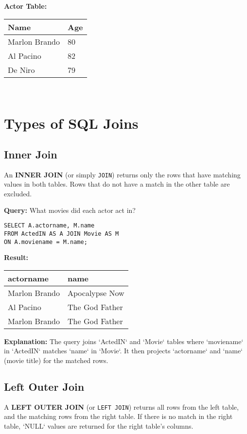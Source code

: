 \documentclass{article}
\begin{document}
\textbf{Actor Table:}\\
\begin{tabular}{|l|l|}
    \hline
    \textbf{Name} & \textbf{Age} \\
    \hline
    Marlon Brando & 80 \\
    Al Pacino & 82 \\
    De Niro & 79 \\
    \hline
\end{tabular}\\

\section*{Types of SQL Joins}

\subsection*{Inner Join}
An \textbf{INNER JOIN} (or simply \texttt{JOIN}) returns only the rows that have matching values in both tables. Rows that do not have a match in the other table are excluded.

\textbf{Query:} What movies did each actor act in? 
\begin{lstlisting}
SELECT A.actorname, M.name
FROM ActedIN AS A JOIN Movie AS M
ON A.moviename = M.name;
\end{lstlisting}

\textbf{Result:}\\
\begin{tabular}{|l|l|}
    \hline
    \textbf{actorname} & \textbf{name} \\
    \hline
    Marlon Brando & Apocalypse Now \\
    Al Pacino & The God Father \\
    Marlon Brando & The God Father \\
    \hline
\end{tabular}

\textbf{Explanation:} The query joins `ActedIN` and `Movie` tables where `moviename` in `ActedIN` matches `name` in `Movie`. It then projects `actorname` and `name` (movie title) for the matched rows.

\subsection*{Left Outer Join}
A \textbf{LEFT OUTER JOIN} (or \texttt{LEFT JOIN}) returns all rows from the left table, and the matching rows from the right table. If there is no match in the right table, `NULL` values are returned for the right table's columns.
\end{document}

